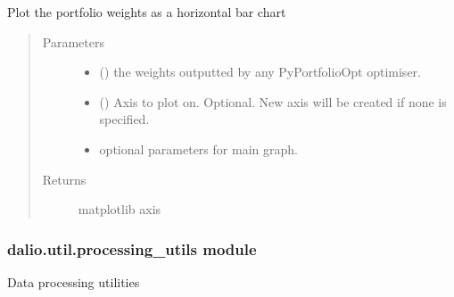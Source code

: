 \documentclass[letterpaper,10pt,english]{sphinxmanual}
\begin{document}
\begin{fulllineitems}
\label{\detokenize{dalio.util:dalio.util.plotting_utils.plot_weights}}
Plot the portfolio weights as a horizontal bar chart
\begin{quote}\begin{description}
\item[{Parameters}] \leavevmode\begin{itemize}
\item {} 
 () \textendash{} the weights outputted by any PyPortfolioOpt
optimiser.

\item {} 
 (\sphinxstyleliteralemphasis{\sphinxupquote{, }}) \textendash{} Axis to plot on. Optional. New axis will
be created if none is specified.

\item {} 
 \textendash{} optional parameters for main graph.

\end{itemize}

\item[{Returns}] \leavevmode
matplotlib axis

\end{description}\end{quote}

\end{fulllineitems}



\subsubsection{dalio.util.processing\_utils module}
\label{\detokenize{dalio.util:module-dalio.util.processing_utils}}\label{\detokenize{dalio.util:dalio-util-processing-utils-module}}
Data processing utilities
\end{document}

